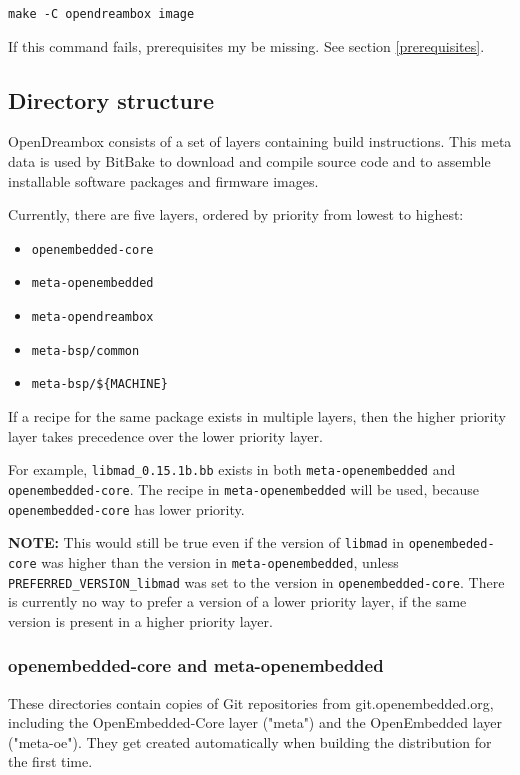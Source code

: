 \documentclass[a4paper]{article}
\newcommand{\shell}[1]{\texttt{\small #1}}
\begin{document}
    \shell{make -C opendreambox image}

    If this command fails, prerequisites my be missing. See section \ref{prerequisites}.

  \subsection{Directory structure}
    OpenDreambox consists of a set of layers containing build instructions.
    This meta data is used by BitBake to download and compile source code
    and to assemble installable software packages and firmware images.

    Currently, there are five layers, ordered by priority from lowest to
    highest:

    \begin{itemize}
      \item \shell{openembedded-core}
      \item \shell{meta-openembedded}
      \item \shell{meta-opendreambox}
      \item \shell{meta-bsp/common}
      \item \shell{meta-bsp/\$\{MACHINE\}}
    \end{itemize}

    If a recipe for the same package exists in multiple layers,
    then the higher priority layer takes precedence over the lower priority
    layer.

    For example, \shell{libmad\_0.15.1b.bb} exists in both
    \shell{meta-openembedded} and \shell{openembedded-core}. The recipe in
    \shell{meta-openembedded} will be used, because \shell{openembedded-core}
    has lower priority.

    \textbf{NOTE:} This would still be true even if the version of \shell{libmad} in
    \shell{openembeded-core} was higher than the version in \shell{meta-openembedded},
    unless \shell{PREFERRED\_VERSION\_libmad} was set to the version in \shell{openembedded-core}.
    There is currently no way to prefer a version of a lower priority layer, if the
    same version is present in a higher priority layer.

    \subsubsection{openembedded-core and meta-openembedded}
       These directories contain copies of Git repositories from git.openembedded.org, including
       the OpenEmbedded-Core layer ("meta") and the OpenEmbedded layer ("meta-oe"). They get created
       automatically when building the distribution for the first time.
\end{document}
